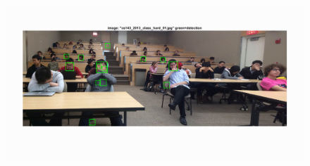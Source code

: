 \documentclass{article}
\begin{document}
\begin{figure}[!htb]
  \centering
  \includegraphics[width=.99\textwidth]{extra_hard2.png}
\end{figure}%
\end{document}
